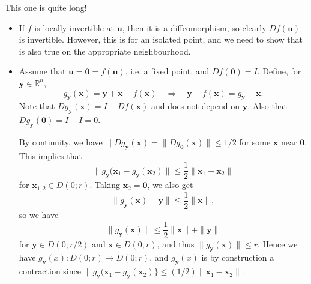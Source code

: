 \documentclass[letter-paper]{tufte-book}
\newenvironment{proof}[1][Proof]{\begin{trivlist}
\item[\hskip \labelsep {\bfseries #1}]}{\end{trivlist}}
\begin{document}
\begin{proof}
  This one is quite long!
  
  \begin{itemize}
    \item If $f$ is locally invertible at $\boldsymbol{u}$, then it is a
    diffeomorphism, so clearly $Df(\boldsymbol{u})$ is invertible. However, this
    is for an isolated point, and we need to show that is also true on the
    appropriate neighbourhood.
    
    \item Assume that $\boldsymbol{u} = \boldsymbol{0} = f(\boldsymbol{u})$,
    i.e. a fixed point, and $Df(\boldsymbol{0}) = I$. Define, for
    $\boldsymbol{y} \in \mathbb{R}^n$,
    \begin{equation*}
      g_{\boldsymbol{y}}(\boldsymbol{x}) = \boldsymbol{y} + \boldsymbol{x} - f(\boldsymbol{x}) \quad \Rightarrow \quad \boldsymbol{y} - f(\boldsymbol{x}) = g_{\boldsymbol{y}} - \boldsymbol{x}.
    \end{equation*}
    Note that $Dg_{\boldsymbol{y}}(\boldsymbol{x}) = I - Df(\boldsymbol{x})$ and
    does not depend on $\boldsymbol{y}$. Also that
    $Dg_{\boldsymbol{y}}(\boldsymbol{0}) = I - I = 0$. 
    
    By continuity, we have $\|Dg_{\boldsymbol{y}}(\boldsymbol{x}) =
    \|Dg_{\boldsymbol{0}}(\boldsymbol{x})\| \leq 1/2$ for some $\boldsymbol{x}$
    near $\boldsymbol{0}$. This implies that
    \begin{equation*}
      \|g_{\boldsymbol{y}}(\boldsymbol{x}_1 - g_{\boldsymbol{y}}(\boldsymbol{x}_2)\| \leq \frac{1}{2}\|\boldsymbol{x}_1 - \boldsymbol{x}_2\|
    \end{equation*}
    for $\boldsymbol{x}_{1,2} \in D(0; r)$. Taking $\boldsymbol{x}_2 =
    \boldsymbol{0}$, we also get
    \begin{equation*}
      \|g_{\boldsymbol{y}}(\boldsymbol{x}) - \boldsymbol{y}\| \leq \frac{1}{2}\|\boldsymbol{x}\|,
    \end{equation*}
    so we have
    \begin{equation*}
      \|g_{\boldsymbol{y}}(\boldsymbol{x})\| \leq \frac{1}{2}\|\boldsymbol{x}\| + \|\boldsymbol{y}\|
    \end{equation*}
    for $\boldsymbol{y} \in D(0; r/2)$ and $\boldsymbol{x} \in D(0; r)$, and
    thus $\|g_{\boldsymbol{y}}(\boldsymbol{x})\| \leq r$. Hence we have
    $g_{\boldsymbol{y}}(x) : D(0; r) \to D(0; r)$, and $g_{\boldsymbol{y}}(x)$
    is by construction a contraction since
    $\|g_{\boldsymbol{y}}(\boldsymbol{x}_1 -
    g_{\boldsymbol{y}}(\boldsymbol{x}_2)\} \leq (1/2)\|\boldsymbol{x}_1 -
    \boldsymbol{x}_2\|$.
  

\end{itemize}
\end{proof}
\end{document}
